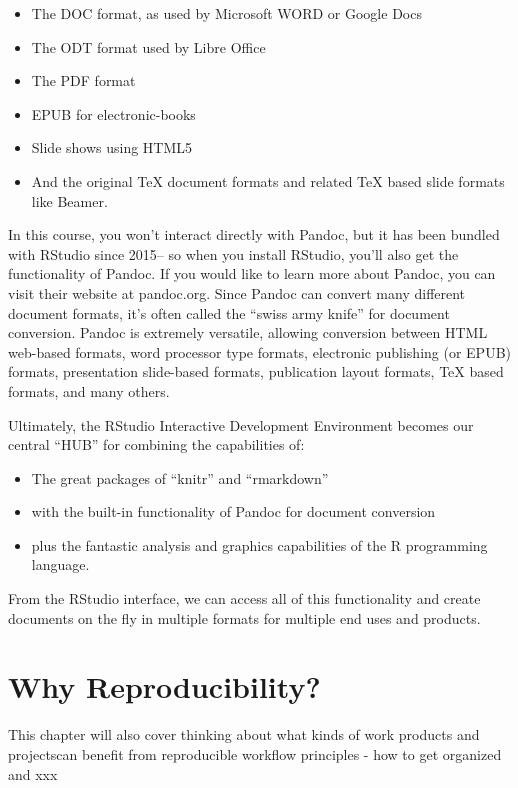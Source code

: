 \documentclass[]{book}
\providecommand{\tightlist}{%
  \setlength{\itemsep}{0pt}\setlength{\parskip}{0pt}}
\theoremstyle{definition}
\theoremstyle{definition}
\theoremstyle{definition}
\theoremstyle{remark}
\begin{document}
\begin{itemize}
\tightlist
\item
  The DOC format, as used by Microsoft WORD or Google Docs
\item
  The ODT format used by Libre Office
\item
  The PDF format
\item
  EPUB for electronic-books
\item
  Slide shows using HTML5
\item
  And the original TeX document formats and related TeX based slide
  formats like Beamer.
\end{itemize}

In this course, you won't interact directly with Pandoc, but it has been
bundled with RStudio since 2015-- so when you install RStudio, you'll
also get the functionality of Pandoc. If you would like to learn more
about Pandoc, you can visit their website at pandoc.org. Since Pandoc
can convert many different document formats, it's often called the
``swiss army knife'' for document conversion. Pandoc is extremely
versatile, allowing conversion between HTML web-based formats, word
processor type formats, electronic publishing (or EPUB) formats,
presentation slide-based formats, publication layout formats, TeX based
formats, and many others.

Ultimately, the RStudio Interactive Development Environment becomes our
central ``HUB'' for combining the capabilities of:

\begin{itemize}
\tightlist
\item
  The great packages of ``knitr'' and ``rmarkdown''
\item
  with the built-in functionality of Pandoc for document conversion
\item
  plus the fantastic analysis and graphics capabilities of the R
  programming language.
\end{itemize}

From the RStudio interface, we can access all of this functionality and
create documents on the fly in multiple formats for multiple end uses
and products.

\chapter{Why Reproducibility?}\label{whyrep}

This chapter will also cover thinking about what kinds of work products
and projectscan benefit from reproducible workflow principles - how to
get organized and xxx
\end{document}
